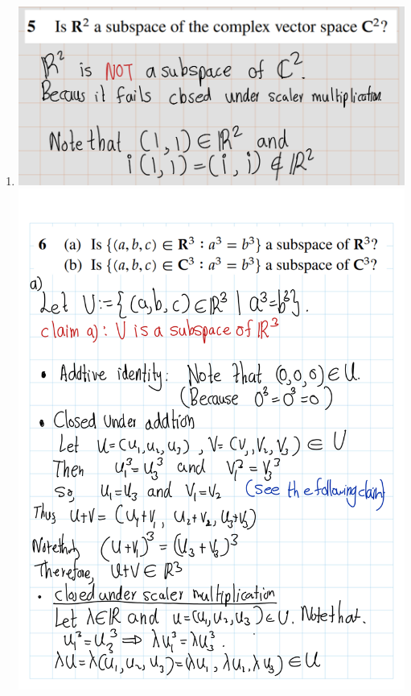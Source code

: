 \documentclass[
]{book}
\theoremstyle{definition}
\theoremstyle{definition}
\theoremstyle{definition}
\theoremstyle{definition}
\theoremstyle{remark}
\begin{document}
\begin{enumerate}
\item
  \includegraphics{fig/Ex1C/Ex5.png}
  \includegraphics{fig/Ex1C/Ex/Ex-01.png}

\end{enumerate}
\end{document}
